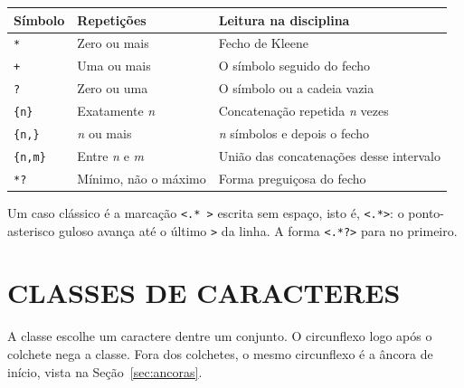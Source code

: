 \documentclass[
    12pt,
    oneside,
    a4paper,
    chapter=TITLE,
    section=TITLE,
    sumario=abnt-6027-2012
]{abntex2}
\begin{document}
\begin{quadro}[!h]
    \centering
    \small
    \begin{tabular}{|p{2.2cm}|p{4.0cm}|p{7.6cm}|}
        \hline
        \textbf{Símbolo} & \textbf{Repetições} & \textbf{Leitura na disciplina} \\
        \hline
        \hline
        \verb|*| & Zero ou mais & Fecho de Kleene \\
        \hline
        \verb|+| & Uma ou mais & O símbolo seguido do fecho \\
        \hline
        \verb|?| & Zero ou uma & O símbolo ou a cadeia vazia \\
        \hline
        \verb|{n}| & Exatamente \textit{n} & Concatenação repetida \textit{n} vezes \\
        \hline
        \verb|{n,}| & \textit{n} ou mais & \textit{n} símbolos e depois o fecho \\
        \hline
        \verb|{n,m}| & Entre \textit{n} e \textit{m} & União das concatenações desse intervalo \\
        \hline
        \verb|*?| & Mínimo, não o máximo & Forma preguiçosa do fecho \\
        \hline
    \end{tabular}
    \fonteautoria
\end{quadro}

Um caso clássico é a marcação \verb|<.* >| escrita sem espaço, isto é, \verb|<.*>|: o ponto-asterisco guloso avança até o último \verb|>| da linha. A forma \verb|<.*?>| para no primeiro.

\section{CLASSES DE CARACTERES}
\label{sec:classes}

A classe escolhe um caractere dentre um conjunto. O circunflexo logo após o colchete nega a classe. Fora dos colchetes, o mesmo circunflexo é a âncora de início, vista na Seção~\ref{sec:ancoras}.
\end{document}
